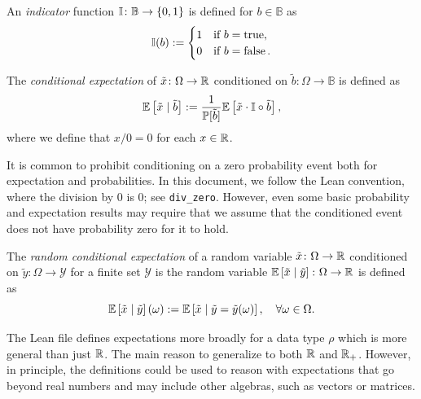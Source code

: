 \begin{definition} \label{def:indicator}
An \emph{indicator} function $\mathbb{I} \colon \mathbb{B} \to \left\{ 0, 1 \right\}$ is defined for $b\in \mathbb{B}$ as
\[
\mathbb{I}(b) :=
\begin{cases}
1 &\text{if } b = \operatorname{true}, \\
0 &\text{if } b = \operatorname{false}.
\end{cases}
\]
\end{definition}

\begin{definition} \label{def:expect-cnd}
The \emph{conditional expectation} of $\tilde{x} \colon \Omega \to \mathbb{R}$ conditioned on $\tilde{b} \colon \Omega \to \mathbb{B}$ is defined as
\[
\mathbb{E} \left[ \tilde{x} \mid  \tilde{b} \right] :=
\frac{1}{\mathbb{P}[\tilde{b}]} \mathbb{E} \left[  \tilde{x} \cdot \mathbb{I} \circ \tilde{b} \right],
\]
where we define that $x / 0 = 0$ for each $x\in \mathbb{R}$.
\end{definition}


\begin{remark}
It is common to prohibit conditioning on a zero probability event both for expectation and probabilities. In this document, we follow the Lean convention, where the division by $0$ is $0$; see \texttt{div\_zero}. However, even some basic probability and expectation results may require that we assume that the conditioned event does not have probability zero for it to hold. 
\end{remark}

\begin{definition} \label{def:expect-cnd-rv}
The \emph{random conditional expectation} of a random variable $\tilde{x} \colon \Omega \to \mathbb{R}$ conditioned on $\tilde{y} \colon \Omega \to \mathcal{Y}$ for a finite set $\mathcal{Y}$ is the random variable $\mathbb{E} \left[ \tilde{x} \mid  \tilde{y} \right]\colon \Omega \to \mathbb{R}$ is defined as
\[
\mathbb{E} \left[ \tilde{x} \mid  \tilde{y} \right](\omega)
:=
\mathbb{E} \left[ \tilde{x} \mid  \tilde{y} = \tilde{y}(\omega) \right], \quad \forall \omega \in \Omega.
\]
\end{definition}

\begin{remark}
The Lean file defines expectations more broadly for a data type $\rho$ which is more general than just $\mathbb{R}$. The main reason to generalize to both $\mathbb{R}$ and $\mathbb{R}_+$. However, in principle, the definitions could be used to reason with expectations that go beyond real numbers and may include other algebras, such as vectors or matrices.
\end{remark}


